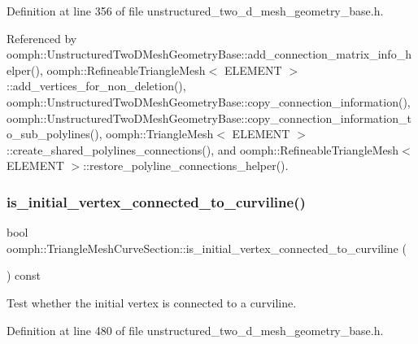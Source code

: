 Definition at line 356 of file unstructured\+\_\+two\+\_\+d\+\_\+mesh\+\_\+geometry\+\_\+base.\+h.



Referenced by oomph\+::\+Unstructured\+Two\+D\+Mesh\+Geometry\+Base\+::add\+\_\+connection\+\_\+matrix\+\_\+info\+\_\+helper(), oomph\+::\+Refineable\+Triangle\+Mesh$<$ E\+L\+E\+M\+E\+N\+T $>$\+::add\+\_\+vertices\+\_\+for\+\_\+non\+\_\+deletion(), oomph\+::\+Unstructured\+Two\+D\+Mesh\+Geometry\+Base\+::copy\+\_\+connection\+\_\+information(), oomph\+::\+Unstructured\+Two\+D\+Mesh\+Geometry\+Base\+::copy\+\_\+connection\+\_\+information\+\_\+to\+\_\+sub\+\_\+polylines(), oomph\+::\+Triangle\+Mesh$<$ E\+L\+E\+M\+E\+N\+T $>$\+::create\+\_\+shared\+\_\+polylines\+\_\+connections(), and oomph\+::\+Refineable\+Triangle\+Mesh$<$ E\+L\+E\+M\+E\+N\+T $>$\+::restore\+\_\+polyline\+\_\+connections\+\_\+helper().

\mbox{\label{classoomph_1_1TriangleMeshCurveSection_a0ab0172007e3e875ff0875a30de76dac}} 
\subsubsection{\texorpdfstring{is\+\_\+initial\+\_\+vertex\+\_\+connected\+\_\+to\+\_\+curviline()}{is\_initial\_vertex\_connected\_to\_curviline()}}
{\footnotesize\ttfamily bool oomph\+::\+Triangle\+Mesh\+Curve\+Section\+::is\+\_\+initial\+\_\+vertex\+\_\+connected\+\_\+to\+\_\+curviline (\begin{DoxyParamCaption}{ }\end{DoxyParamCaption}) const\hspace{0.3cm}{\ttfamily [inline]}}



Test whether the initial vertex is connected to a curviline. 



Definition at line 480 of file unstructured\+\_\+two\+\_\+d\+\_\+mesh\+\_\+geometry\+\_\+base.\+h.



